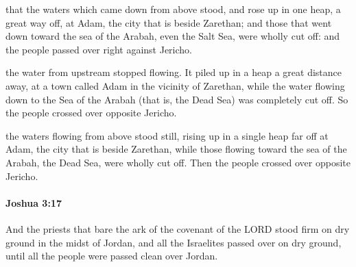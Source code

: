 			\begin{versebox}
					\item[BHS] 
					\item[ASV] that the waters which came down from above stood, and rose up in one heap, a great way off, at Adam, the city that is beside Zarethan; and those that went down toward the sea of the Arabah, even the Salt Sea, were wholly cut off: and the people passed over right against Jericho.
					\item[NIV] the water from upstream stopped flowing. It piled up in a heap a great distance away, at a town called Adam in the vicinity of Zarethan, while the water flowing down to the Sea of the Arabah (that is, the Dead Sea) was completely cut off. So the people crossed over opposite Jericho.
					\item[NRSV] the waters flowing from above stood still, rising up in a single heap far off at Adam, the city that is beside Zarethan, while those flowing toward the sea of the Arabah, the Dead Sea, were wholly cut off. Then the people crossed over opposite Jericho.
			\end{versebox}

		\paragraph{Joshua 3:17} %
			\label{JOSHUA-3-17}

			And the priests that bare the ark of the covenant of the LORD stood firm on dry ground in the midst of Jordan, and all the Israelites passed over on dry ground, until all the people were passed clean over Jordan.

